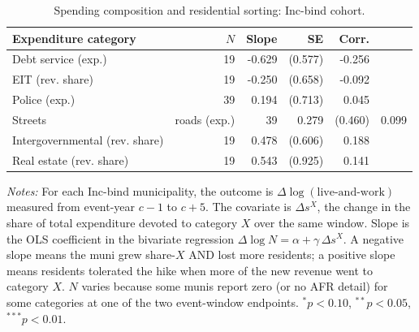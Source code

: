 \begin{table}[H]
  \centering
  \caption{Spending composition and residential sorting: Inc-bind cohort.}
  \label{tab:spending_decomposition}
  \small
  \begin{tabular}{lrrrr}
    \toprule
    Expenditure category & $N$ & Slope & SE & Corr. \\
    \midrule
    Debt service (exp.) & 19 & -0.629 & (0.577) & -0.256 \\
    EIT (rev. share) & 19 & -0.250 & (0.658) & -0.092 \\
    Police (exp.) & 39 & 0.194 & (0.713) & 0.045 \\
    Streets & roads (exp.) & 39 & 0.279 & (0.460) & 0.099 \\
    Intergovernmental (rev. share) & 19 & 0.478 & (0.606) & 0.188 \\
    Real estate (rev. share) & 19 & 0.543 & (0.925) & 0.141 \\
    \bottomrule
  \end{tabular}
  \vspace{0.3em}
  \begin{minipage}{0.95\textwidth}
    \footnotesize \textit{Notes:} For each Inc-bind
    municipality, the outcome is
    $\Delta\log(\text{live-and-work})$ measured from
    event-year $c{-}1$ to $c{+}5$. The covariate is
    $\Delta s^{X}$, the change in the share of
    total expenditure devoted to category $X$ over the
    same window. Slope is the OLS coefficient in the
    bivariate regression
    $\Delta\log N = \alpha + \gamma \, \Delta s^{X}$.
    A negative slope means the muni grew share-$X$ AND
    lost more residents; a positive slope means residents
    tolerated the hike when more of the new revenue went
    to category $X$. $N$ varies because some munis report
    zero (or no AFR detail) for some categories at one of
    the two event-window endpoints. $^{*}p<0.10$,
    $^{**}p<0.05$, $^{***}p<0.01$.
  \end{minipage}
\end{table}
